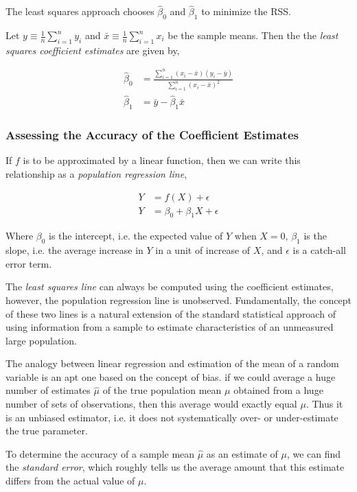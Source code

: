 \documentclass{article}
\begin{document}
The least squares approach chooses $\hat \beta_0 $ and $\hat \beta_1$ to minimize the RSS.

Let $ y \equiv \frac{1}{n} \sum^n_{i=1} y_i$ and $\bar x \equiv \frac{1}{n} \sum_{i=1}^n x_i$ be the sample means. Then the the \textit{least squares coefficient estimates} are given by,

\begin{align*}
    \hat \beta_0 &= \frac{\sum_{i=1}^n (x_i - \bar x) (y_i - \bar y)}{\sum_{i=1}^n (x_i - \bar x)^2} \\ 
    \hat \beta_1 &= \bar y - \hat \beta_1 \bar x
\end{align*}

 
\subsubsection{Assessing the Accuracy of the Coefficient Estimates}

If $f$ is to be approximated by a linear function, then we can write this relationship as a \textit{population regression line},

\begin{align*}
 Y &= f(X) +  \epsilon \\
 Y  &= \beta_0 +  \beta_1 X + \epsilon
\end{align*}
 
Where $\beta_0$ is the intercept, i.e. the expected value of $Y$ when $X = 0$, $\beta_1$ is the slope, i.e.  the average increase in $Y$ in a unit of increase of $X$, and $\epsilon$ is a catch-all error term.
 
The \textit{least squares line} can always be computed using the coefficient estimates, however, the population regression line is unobserved. Fundamentally, the concept of these two lines is a natural extension of the standard statistical approach of using information from a sample to estimate characteristics of an unmeasured large population.
 
The analogy between linear regression and estimation of the mean of a
random variable is an apt one based on the concept of bias. if we could average a huge number of estimates $\hat \mu$ of the true population mean $\mu$ obtained from a huge number of sets of observations, then this average would exactly equal $\mu$. Thus it is an unbiased estimator, i.e. it does not systematically over- or under-estimate the true parameter. 

To determine the accuracy of a sample mean $\hat \mu$ as an estimate of $\mu$, we can find the \textit{standard error}, which roughly tells us the average amount that this estimate differs from the actual value of $\mu$. 
\end{document}
